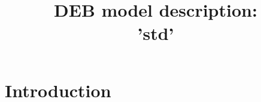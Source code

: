 \documentclass{article}
\title{DEB model description:\\ 
'std'}
\date
\begin{document}
\maketitle

\section{Introduction}


\end{document}
